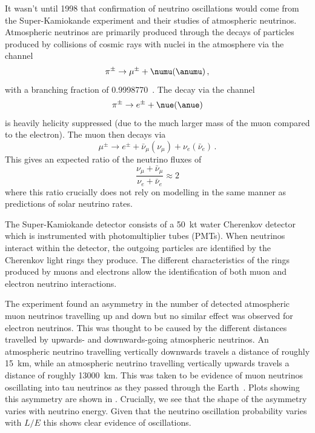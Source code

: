 It wasn't until 1998 that confirmation of neutrino oscillations would come from the Super-Kamiokande experiment and their studies of atmospheric neutrinos.
Atmospheric neutrinos are primarily produced through the decays of particles produced by collisions of cosmic rays with nuclei in the atmosphere via the channel
\begin{equation}
  \pi^{\pm} \rightarrow \mu^{\pm} + \numu(\anumu) \, ,
\end{equation}
with a branching fraction of \num{0.9998770}~\cite{pdg2018}.
The decay via the channel
\begin{equation}
	\pi^{\pm} \rightarrow e^{\pm} + \nue(\anue) 
\end{equation}
is heavily helicity suppressed (due to the much larger mass of the muon compared to the electron).
The muon then decays via
\begin{equation}
  \mu^{\pm} \rightarrow e^{\pm} + \bar{\nu}_{\mu}(\nu_{\mu}) + \nu_{e}(\bar{\nu}_{e}) \, .
\end{equation}
This gives an expected ratio of the neutrino fluxes of
\begin{equation}
  \frac{\nu_{\mu} + \bar{\nu}_{\mu}}{\nu_{e} + \bar{\nu}_{e}} \approx 2
\end{equation}
where this ratio crucially does not rely on modelling in the same manner as predictions of solar neutrino rates.

The Super-Kamiokande detector consists of a \SI{50}{\kilo\tonne} water Cherenkov detector which is instrumented with photomultiplier tubes (PMTs).
When neutrinos interact within the detector, the outgoing particles are identified by the Cherenkov light rings they produce.
The different characteristics of the rings produced by muons and electrons allow the identification of both muon and electron neutrino interactions.

The experiment found an asymmetry in the number of detected atmospheric muon neutrinos travelling up and down but no similar effect was observed for electron neutrinos.
This was thought to be caused by the different distances travelled by upwards- and downwards-going atmospheric neutrinos.
An atmospheric neutrino travelling vertically downwards travels a distance of roughly \SI{15}{\km}, while an atmospheric neutrino travelling vertically upwards travels a distance of roughly \SI{13000}{\km}.
This was taken to be evidence of muon neutrinos oscillating into tau neutrinos as they passed through the Earth~\cite{superK}.
Plots showing this asymmetry are shown in .
Crucially, we see that the shape of the asymmetry varies with neutrino energy. 
Given that the neutrino oscillation probability varies with $L/E$ this shows clear evidence of oscillations.

